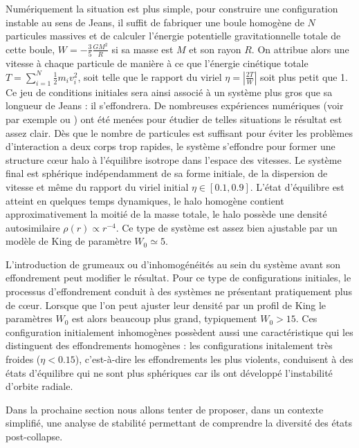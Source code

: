 Numériquement la situation est plus simple, pour construire une configuration instable au sens de Jeans, il suffit de
fabriquer une boule homogène de $N$ particules massives et de calculer l'énergie potentielle gravitationnelle totale de
cette boule, $W=-\frac{3}{5}\frac{GM^2}{R}$ si sa masse est $M$ et son rayon $R$. On attribue alors une vitesse à chaque
particule de manière à ce que l'énergie cinétique totale $T=\sum_{i=1}^N\frac{1}{2}m_i v_i^2$, soit telle que le rapport
du viriel $\eta=\left|\frac{2T}{W}\right|$ soit plus petit que 1.  Ce jeu de conditions initiales sera ainsi associé à
un système plus gros que sa longueur de Jeans : il s'effondrera. De nombreuses expériences numériques (voir par exemple
\cite{roy} ou \cite{Joyceetal}) ont été menées pour étudier de telles situations le résultat est assez clair. Dès que le
nombre de particules est suffisant pour éviter les problèmes d'interaction a deux corps trop rapides, le système
s'effondre pour former une structure c\oe ur halo à l'équilibre isotrope dans l'espace des vitesses. Le système final
est sphérique indépendamment de sa forme initiale, de la dispersion de vitesse et même du rapport du viriel initial
$\eta\in[0.1, 0.9]$. L'état d'équilibre est atteint en quelques temps dynamiques, le halo homogène contient
approximativement la moitié de la masse totale, le halo possède une densité autosimilaire $\rho(r)\propto r^{-4}$. Ce
type de système est assez bien ajustable par un modèle de King de paramètre $W_0\simeq 5$.

L'introduction de grumeaux ou d'inhomogénéités au sein du système avant son effondrement peut modifier le résultat. Pour ce type de configurations initiales, le processus d'effondrement conduit à des systèmes ne présentant pratiquement plus de c\oe ur. Lorsque que l'on peut ajuster leur densité  par un profil de King le paramètres $W_0$ est alors beaucoup plus grand, typiquement  $W_0>15$. Ces configuration initialement inhomogènes  possèdent aussi une caractéristique qui les distinguent des effondrements homogènes : les configurations initalement très froides ($\eta<0.15$), c'est-à-dire les effondrements les plus violents, conduisent à des états d'équilibre qui ne sont plus sphériques car ils ont développé l'instabilité d'orbite radiale.  


Dans la prochaine section nous allons tenter de proposer, dans un contexte simplifié, une analyse de stabilité permettant de comprendre la diversité des états post-collapse.

